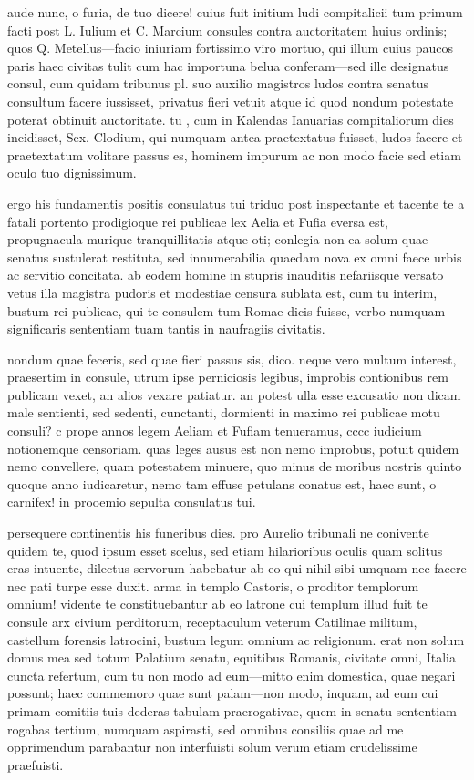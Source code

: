 aude nunc, o furia, de tuo dicere! cuius fuit initium ludi compitalicii tum primum facti post L. Iulium et C. Marcium consules contra auctoritatem huius ordinis; quos Q. Metellus—facio iniuriam fortissimo viro mortuo, qui illum cuius paucos paris haec civitas tulit cum hac importuna belua conferam—sed ille designatus consul, cum quidam tribunus pl. suo auxilio magistros ludos contra senatus consultum facere iussisset, privatus fieri vetuit atque id quod nondum potestate poterat obtinuit auctoritate. tu , cum in Kalendas Ianuarias compitaliorum dies incidisset, Sex. Clodium, qui numquam antea praetextatus fuisset, ludos facere et praetextatum volitare passus es, hominem impurum ac non modo facie sed etiam oculo tuo dignissimum.

 ergo his fundamentis positis consulatus tui triduo post inspectante et tacente te a fatali portento prodigioque rei publicae lex Aelia et Fufia eversa est, propugnacula murique tranquillitatis atque oti; conlegia non ea solum quae senatus sustulerat restituta, sed innumerabilia quaedam nova ex omni faece urbis ac servitio concitata. ab eodem homine in stupris inauditis nefariisque versato vetus illa magistra pudoris et modestiae censura sublata est, cum tu interim, bustum rei publicae, qui te consulem tum Romae dicis fuisse, verbo numquam significaris sententiam tuam tantis in naufragiis civitatis.

 nondum quae feceris, sed quae fieri passus sis, dico. neque vero multum interest, praesertim in consule, utrum ipse perniciosis legibus, improbis contionibus rem publicam vexet, an alios vexare patiatur. an potest ulla esse excusatio non dicam male sentienti, sed sedenti, cunctanti, dormienti in maximo rei publicae motu consuli? c prope annos legem Aeliam et Fufiam tenueramus, cccc iudicium notionemque censoriam. quas leges ausus est non nemo improbus, potuit quidem nemo convellere, quam potestatem minuere, quo minus de moribus nostris quinto quoque anno iudicaretur, nemo tam effuse petulans conatus est, haec sunt, o carnifex! in prooemio sepulta consulatus tui.

 persequere continentis his funeribus dies. pro Aurelio tribunali ne conivente quidem te, quod ipsum esset scelus, sed etiam hilarioribus oculis quam solitus eras intuente, dilectus servorum habebatur ab eo qui nihil sibi umquam nec facere nec pati turpe esse duxit. arma in templo Castoris, o proditor templorum omnium! vidente te constituebantur ab eo latrone cui templum illud fuit te consule arx civium perditorum, receptaculum veterum Catilinae militum, castellum forensis latrocini, bustum legum omnium ac religionum. erat non solum domus mea sed totum Palatium senatu, equitibus Romanis, civitate omni, Italia cuncta refertum, cum tu non modo ad eum—mitto enim domestica, quae negari possunt; haec commemoro quae sunt palam—non modo, inquam, ad eum cui primam comitiis tuis dederas tabulam praerogativae, quem in senatu sententiam rogabas tertium, numquam aspirasti, sed omnibus consiliis quae ad me opprimendum parabantur non interfuisti solum verum etiam crudelissime praefuisti.

